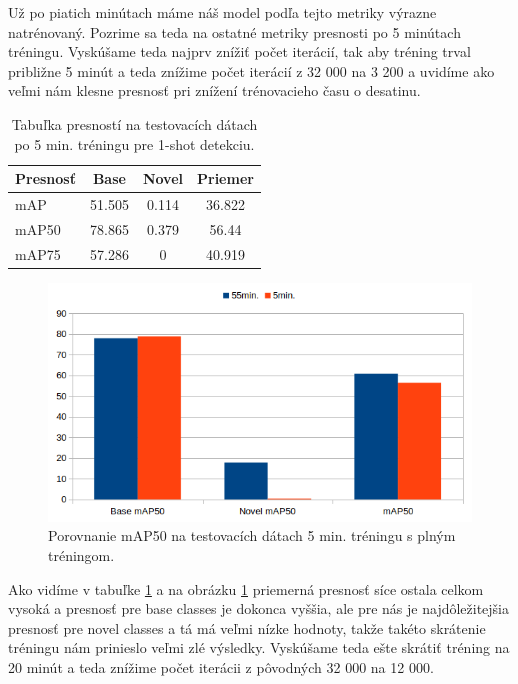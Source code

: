 Už po piatich minútach máme náš model podľa tejto metriky výrazne natrénovaný. Pozrime sa teda na ostatné metriky presnosti po 5 minútach tréningu. Vyskúšame teda najprv znížiť počet iterácií, tak aby tréning trval približne 5 minút a teda znížime počet iterácií z 32 000 na 3 200 a uvidíme ako veľmi nám klesne presnosť pri znížení trénovacieho času o desatinu.

\begin{table}[H]
\begin{tabular}{|l|c|c|c|}
\hline
\textbf{Presnosť} & \textbf{Base} & \textbf{Novel} & \textbf{Priemer} \\
\hline
mAP & 51.505 & 0.114 & 36.822 \\
mAP50 & 78.865 & 0.379 & 56.44 \\
mAP75 & 57.286 & 0 & 40.919 \\
\hline
\end{tabular}
\centering
\caption{Tabuľka presností na testovacích dátach po 5 min. tréningu pre 1-shot detekciu.}
\label{tab:table50}
\end{table}

\begin{figure}[H]
\centering
\includegraphics[width=\textwidth]{images/chart_compare_5min.png}
\caption{Porovnanie mAP50 na testovacích dátach 5 min. tréningu s plným tréningom.}
\label{fig:image2}
\end{figure}

Ako vidíme v tabuľke \ref{tab:table50} a na obrázku \ref{fig:image2} priemerná presnosť síce ostala celkom vysoká a presnosť pre base classes je dokonca vyššia, ale pre nás je najdôležitejšia presnosť pre novel classes a tá má veľmi nízke hodnoty, takže takéto skrátenie tréningu nám prinieslo veľmi zlé výsledky. Vyskúšame teda ešte skrátiť tréning na 20 minút a teda znížime počet iterácii z pôvodných 32 000 na 12 000.

